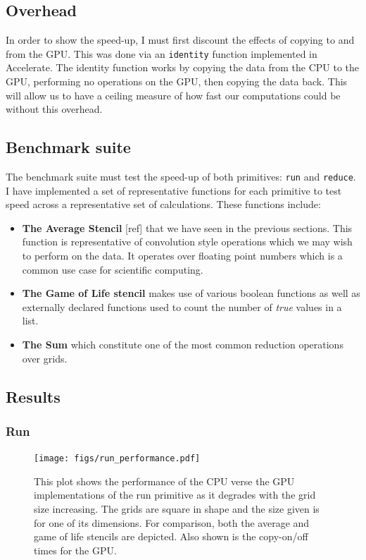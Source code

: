 \documentclass[12pt,a4paper,twoside]{scrbook}
\begin{document}
\subsection{Overhead}

In order to show the speed-up, I must first discount the effects of copying to
and from the GPU. This was done via an \texttt{identity} function implemented in
Accelerate. The identity function works by copying the data from the CPU to the
GPU, performing no operations on the GPU, then copying the data back. This will
allow us to have a ceiling measure of how fast our computations could be
without this overhead.

\subsection{Benchmark suite}

The benchmark suite must test the speed-up of both primitives: \texttt{run} and
\texttt{reduce}. I have implemented a set of representative functions for each
primitive to test speed across a representative set of calculations. These
functions include:

\begin{itemize}
\itemsep1pt\parskip0pt
\item
  \textbf{The Average Stencil} {[}ref{]} that we have seen in the
  previous sections. This function is representative of convolution
  style operations which we may wish to perform on the data. It operates
  over floating point numbers which is a common use case for scientific
  computing.
\item
  \textbf{The Game of Life stencil} makes use of various boolean
  functions as well as externally declared functions used to count the
  number of \emph{true} values in a list.
\item
  \textbf{The Sum} which constitute one of the most common reduction
  operations over grids.
\end{itemize}

\subsection{Results}

\subsubsection{Run}

\begin{figure}[h]
  \texttt{[image: figs/run\_performance.pdf]}
  \caption{This plot shows the performance of the CPU verse the GPU
    implementations of the run primitive as it degrades with the grid size
    increasing. The grids are square in shape and the size given is for one of
    its dimensions. For comparison, both the average and game of life stencils
    are depicted. Also shown is the copy-on/off times for the GPU.}
  \label{fig:runperf100}
\end{figure}
\end{document}
